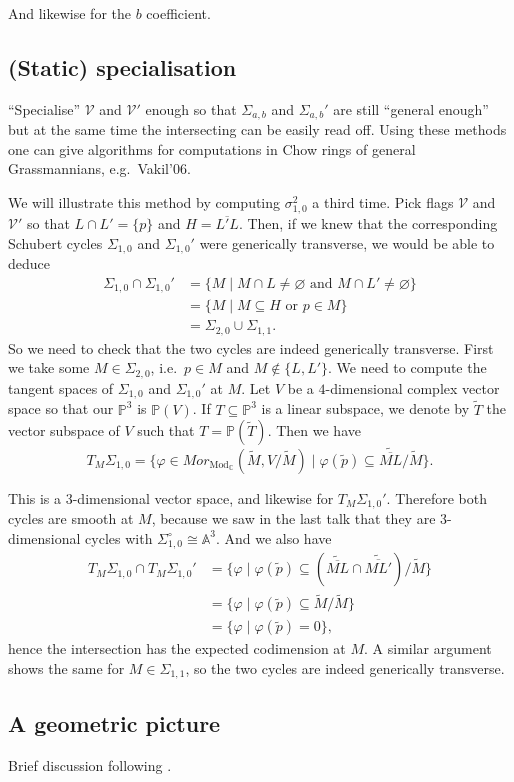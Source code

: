\documentclass[12pt,a4paper]{amsart}
\theoremstyle{plain}
\theoremstyle{definition}
\theoremstyle{remark}
\begin{document}
And likewise for the $b$ coefficient.

\subsection{(Static) specialisation}

``Specialise'' $\mathcal{V}$ and $\mathcal{V}'$ enough so that  $\Sigma_{a,b}$ and $\Sigma_{a,b}'$ are still ``general enough'' but at the same time the intersecting can be easily read off.
Using these methods one can give algorithms for computations in Chow rings of general Grassmannians, e.g.~Vakil'06.

We will illustrate this method by computing $\sigma_{1,0}^{2}$ a third time.
Pick flags $\mathcal{V}$ and $\mathcal{V}'$ so that $L\cap L'=\{p\}$ and $H=\overline{L'L}$.
Then, if we knew that the corresponding Schubert cycles $\Sigma_{1,0}$ and $\Sigma_{1,0}'$ were generically transverse, we would be able to deduce
\begin{align*}
    \Sigma_{1,0}\cap \Sigma_{1,0}' & = \{ M \mid M\cap L\neq \varnothing \text{ and }M\cap L'\neq \varnothing\} \\
    & = \{ M\mid M\subseteq H \text{ or } p\in M\} \\
    & = \Sigma_{2,0}\cup \Sigma_{1,1}.
\end{align*}
So we need to check that the two cycles are indeed generically transverse.
First we take some $M\in \Sigma_{2,0}$, i.e.~$p\in M$ and $M\not\in \{L,L'\}$.
We need to compute the tangent spaces of $\Sigma_{1,0}$ and $\Sigma_{1,0}'$ at $M$.
Let $V$ be a $4$-dimensional complex vector space so that our $\mathbb{P}^{3}$ is $\mathbb{P}(V)$.
If $T\subseteq \mathbb{P}^{3}$ is a linear subspace, we denote by $\tilde{T}$ the vector subspace of $V$ such that $T=\mathbb{P}(\tilde{T})$.
Then we have
\[ T_{M}\Sigma_{1,0}=\{ \varphi\in Mor_{\operatorname{Mod}_{\mathbb{C}}}(\tilde{M},V/\tilde{M}) \mid \varphi(\tilde{p})\subseteq \tilde{\overline{ML}}/\tilde{M}\}. \]

This is a $3$-dimensional vector space, and likewise for $T_{M}\Sigma_{1,0}'$.
Therefore both cycles are smooth at $M$, because we saw in the last talk that they are $3$-dimensional cycles with $\Sigma_{1,0}^{\circ}\cong \mathbb{A}^{3}$.
And we also have
\begin{align*}
    T_{M}\Sigma_{1,0}\cap T_{M}\Sigma_{1,0}' & = \{\varphi \mid \varphi(\tilde{p})\subseteq (\tilde{\overline{ML}}\cap \tilde{\overline{ML'}})/\tilde{M} \} \\
    & = \{ \varphi \mid\varphi(\tilde{p})\subseteq \tilde{M}/\tilde{M} \} \\
    & = \{ \varphi \mid \varphi(\tilde{p})=0 \},
\end{align*}
hence the intersection has the expected codimension at $M$.
A similar argument shows the same for $M\in \Sigma_{1,1}$, so the two cycles are indeed generically transverse.

\subsection{A geometric picture}

Brief discussion following \cite[\S 3.4.1]{eh16}.

\printbibliography
\vfill
\end{document}
